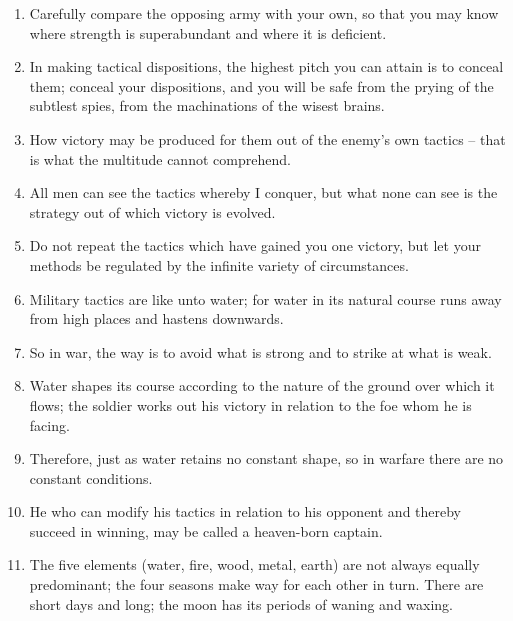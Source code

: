\documentclass[oneside]{book}
\begin{document}
\begin{enumerate}
	\item Carefully compare the opposing army with your own, so that you may know where strength is superabundant and where it is deficient.
	\item In making tactical dispositions, the highest pitch you can attain is to conceal them; conceal your dispositions, and you will be safe from the prying of the subtlest spies, from the machinations of the wisest brains.
	\item How victory may be produced for them out of the enemy's own tactics – that is what the multitude cannot comprehend.
	\item All men can see the tactics whereby I conquer, but what none can see is the strategy out of which victory is evolved.
	\item Do not repeat the tactics which have gained you one victory, but let your methods be regulated by the infinite variety of circumstances.
	\item Military tactics are like unto water; for water in its natural course runs away from high places and hastens downwards.
	\item So in war, the way is to avoid what is strong and to strike at what is weak.
	\item Water shapes its course according to the nature of the ground over which it flows; the soldier works out his victory in relation to the foe whom he is facing.
	\item Therefore, just as water retains no constant shape, so in warfare there are no constant conditions.
	\item He who can modify his tactics in relation to his opponent and thereby succeed in winning, may be called a heaven-born captain.
	\item The five elements (water, fire, wood, metal, earth) are not always equally predominant; the four seasons make way for each other in turn. There are short days and long; the moon has its periods of waning and waxing.
\end{enumerate}
\end{document}
